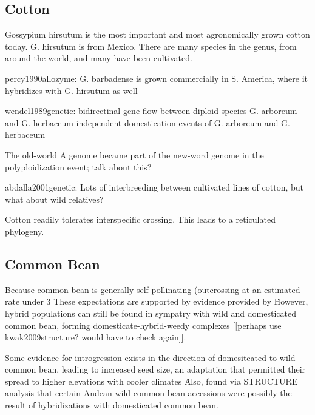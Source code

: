 \documentclass[11pt]{article}
\begin{document}
\subsection*{Cotton}

Gossypium hirsutum is the most important and most agronomically grown cotton today.
G. hirsutum is from Mexico.
There are many species in the genus, from around the world, and many have been cultivated.

percy1990allozyme:
G. barbadense is grown commercially in S. America, where it hybridizes with G. hirsutum as well

wendel1989genetic:
bidirectinal gene flow between diploid species G. arboreum and G. herbaceum
independent domestication events of G. arboreum and G. herbaceum

The old-world A genome became part of the new-word genome in the polyploidization event; talk about this?

abdalla2001genetic:
Lots of interbreeding between cultivated lines of cotton, but what about wild relatives?

Cotton readily tolerates interspecific crossing.
This leads to a reticulated phylogeny.







\subsection*{Common Bean}

Because common bean is generally self-pollinating (outcrossing at an estimated rate under 3%
These expectations are supported by evidence provided by \cite{papa2003asymmetry}\.
However, hybrid populations can still be found in sympatry with wild and domesticated common bean, forming domesticate-hybrid-weedy complexes [[perhaps use kwak2009structure?  would have to check again]].

Some evidence for introgression exists in the direction of domesitcated to wild common bean, leading to increased seed size, an adaptation that permitted their spread to higher elevations with cooler climates \cite{debouck1993genetic}\.
Also, \cite{kwak2009structure} found via STRUCTURE analysis that certain Andean wild common bean accessions were possibly the result of hybridizations with domesticated common bean.
\end{document}
